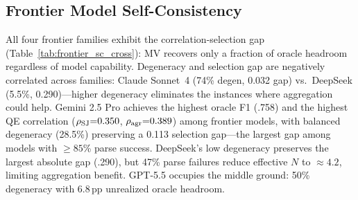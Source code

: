 \subsection{Frontier Model Self-Consistency}\label{app:frontier_sc}

\begin{table}[h]
\centering
\small
\caption{Cross-family frontier SC on Few-NERD ($N{=}8$, $T{=}1.0$, 200 instances, zero-shot). Parse failures excluded from all metrics; $N_{\textit{eff}}$: mean effective samples after exclusion. Selection gap $= $ oracle $-$ MV. Text-based entity matching (Appendix~\ref{app:frontier_sc}, entity matching paragraph). Qwen3-8B FT shown for reference.}
\label{tab:frontier_sc_cross}
\end{table}

All four frontier families exhibit the correlation-selection gap (Table~\ref{tab:frontier_sc_cross}): MV recovers only a fraction of oracle headroom regardless of model capability.
Degeneracy and selection gap are negatively correlated across families: Claude Sonnet~4 (74\% degen, 0.032 gap) vs.\ DeepSeek (5.5\%, 0.290)---higher degeneracy eliminates the instances where aggregation could help.
Gemini 2.5 Pro achieves the highest oracle F1 (.758) and the highest QE correlation ($\rho_{\textup{SJ}}{=}0.350$, $\rho_{\textup{agr}}{=}0.389$) among frontier models, with balanced degeneracy (28.5\%) preserving a 0.113 selection gap---the largest gap among models with ${\geq}85$\% parse success.
DeepSeek's low degeneracy preserves the largest absolute gap (.290), but 47\% parse failures reduce effective $N$ to ${\approx}4.2$, limiting aggregation benefit.
GPT-5.5 occupies the middle ground: 50\% degeneracy with 6.8\,pp unrealized oracle headroom.

